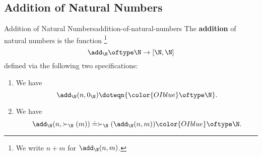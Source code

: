 \subsection{Addition of Natural Numbers}\label{subsection-martin-löf-type-theory-addition-of-natural-numbers}
\begin{definition}{Addition of Natural Numbers}{addition-of-natural-numbers}%
    The \textbf{addition} of natural numbers is the function%
    \footnote{%
        We write $n+m$ for $\add_{\N}(n,m)$.
        \par\vspace*{\TCBBoxCorrection}
    }%
    \[
        \add_{\N}%
        \oftype%
        \N%
        \to%
        [\N,\N]%
    \]%
    defined via the following two specifications:%
    \begin{enumerate}
        \item\label{addition-of-natural-numbers-the-base-case}We have
            \[
                \add_{\N}(n,0_{\N})%
                \doteq%
                n%
                {\color{OIblue}\oftype\N}.%
            \]%
        \item\label{addition-of-natural-numbers-the-inductive-step}We have
            \[
                \add_{\N}(n,\succ_{\N}(m))%
                \doteq%
                \succ_{\N}(\add_{\N}(n,m))%
                {\color{OIblue}\oftype\N}.%
            \]%
    \end{enumerate}
\end{definition}

